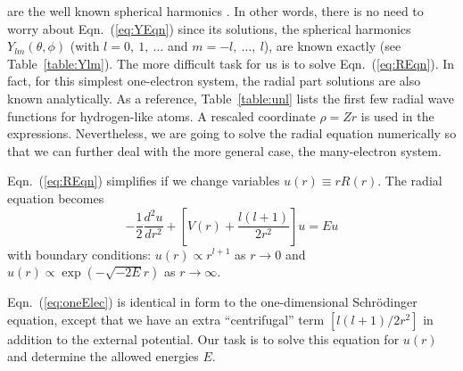 are the well known spherical harmonics \cite{QM}. In other words, there is no
need to worry about Eqn.~(\ref{eq:YEqn}) since its solutions, the spherical harmonics
$Y_{lm}(\theta,\phi)$ (with $l=0,\ 1,\ \ldots$ and $m=-l,\ \ldots,\ l$),
are known exactly (see Table~\ref{table:Ylm}).
The more difficult task for us is to solve Eqn.~(\ref{eq:REqn}).
In fact, for this simplest one-electron system, the radial part solutions are also known
analytically. As a reference, Table~\ref{table:unl} lists the first few radial wave functions
for hydrogen-like atoms. A rescaled coordinate $\rho=Zr$ is used in the expressions.
Nevertheless, we are going to solve the radial equation numerically
so that we can further deal with the more general case, the many-electron system.

Eqn.~(\ref{eq:REqn}) simplifies if we change variables $u(r) \equiv rR(r)$. The
radial equation becomes
\begin{equation} \label{eq:oneElec}
\boxed{-\frac{1}{2} \frac{d^2u}{dr^2} + \left[ V(r) + \frac{l(l+1)}{2r^2} \right] u = E u}
\end{equation}
with boundary conditions: $u(r) \propto r^{l+1}$ as $r\rightarrow0$ and
$u(r) \propto \exp{(-\sqrt{-2E}r)}$ as
$r\rightarrow\infty$.

Eqn.~(\ref{eq:oneElec}) is identical in form to the one-dimensional
Schr{\"o}dinger equation, except that we have an extra ``centrifugal'' term
$[l(l+1)/2r^2]$ in addition to the external potential. Our task
is to solve this equation for $u(r)$ and determine the allowed
energies $E$.

